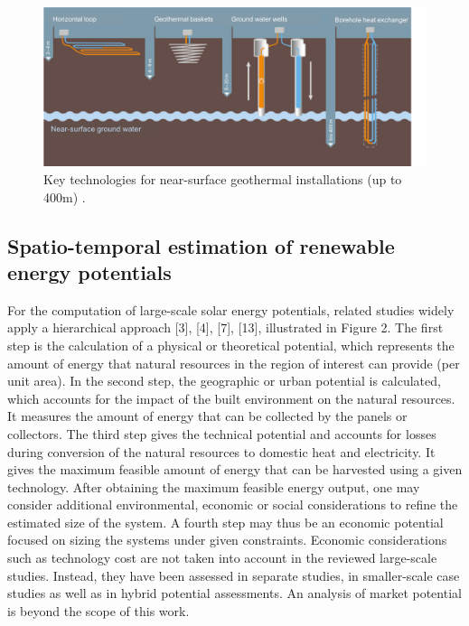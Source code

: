 \begin{figure}
\centering 
\includegraphics[width=\textwidth]{images/Figs/shallow_technologies.png} 
\caption{Key technologies for near-surface geothermal installations (up to 400m) \cite{stmwi_arten_nodate}.}
\label{fig:shallow_gshp} 
\end{figure}

\subsection{Spatio-temporal estimation of renewable energy potentials}

For the computation of large-scale solar energy potentials, related studies widely apply a hierarchical approach [3], [4], [7], [13], illustrated in Figure 2. The first step is the calculation of a physical or theoretical potential, which represents the amount of energy that natural resources in the region of interest can provide (per unit area). In the second step, the geographic or urban potential is calculated, which accounts for the impact of the built environment on the natural resources. It measures the amount of energy that can be collected by the panels or collectors. The third step gives the technical potential and accounts for losses during conversion of the natural resources to domestic heat and electricity. It gives the maximum feasible amount of energy that can be harvested using a given technology. After obtaining the maximum feasible energy output, one may consider additional environmental, economic or social considerations to refine the estimated size of the system. A fourth step may thus be an economic potential focused on sizing the systems under given constraints. Economic considerations such as technology cost are not taken into account in the reviewed large-scale studies. Instead, they have been assessed in separate studies, in smaller-scale case studies as well as in hybrid potential assessments. An analysis of market potential is beyond the scope of this work. 
 
